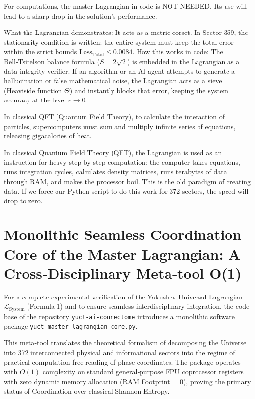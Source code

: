 \documentclass[12pt,a4paper]{article}
\begin{document}
	For computations, the master Lagrangian in code is NOT NEEDED. Its use will lead to a sharp drop in the solution's performance.
	
	What the Lagrangian demonstrates: It acts as a metric corset. In Sector 359, the stationarity condition is written: the entire system must keep the total error within the strict bounds \(\text{Loss}_{\text{Total}} \le 0.0084\). How this works in code: The Bell‑Tsirelson balance formula (\(S = 2\sqrt{2}\)) is embedded in the Lagrangian as a data integrity verifier. If an algorithm or an AI agent attempts to generate a hallucination or false mathematical noise, the Lagrangian acts as a sieve (Heaviside function \(\Theta\)) and instantly blocks that error, keeping the system accuracy at the level \(\epsilon \to 0\).
	
	In classical QFT (Quantum Field Theory), to calculate the interaction of particles, supercomputers must sum and multiply infinite series of equations, releasing gigacalories of heat.
	
	In classical Quantum Field Theory (QFT), the Lagrangian is used as an instruction for heavy step‑by‑step computation: the computer takes equations, runs integration cycles, calculates density matrices, runs terabytes of data through RAM, and makes the processor boil. This is the old paradigm of creating data. If we force our Python script to do this work for 372 sectors, the speed will drop to zero.
	
	\section{Monolithic Seamless Coordination Core of the Master Lagrangian: A Cross‑Disciplinary Meta‑tool O(1)}
	For a complete experimental verification of the Yakushev Universal Lagrangian \(\mathscr{L}_{\text{System}}\) (Formula 1) and to ensure seamless interdisciplinary integration, the code base of the repository \texttt{yuct-ai-connectome} introduces a monolithic software package \texttt{yuct_master_lagrangian_core.py}.
	
	This meta‑tool translates the theoretical formalism of decomposing the Universe into 372 interconnected physical and informational sectors into the regime of practical computation‑free reading of phase coordinates. The package operates with \(O(1)\) complexity on standard general‑purpose FPU coprocessor registers with zero dynamic memory allocation (RAM Footprint = 0), proving the primary status of Coordination over classical Shannon Entropy.
	
\end{document}
